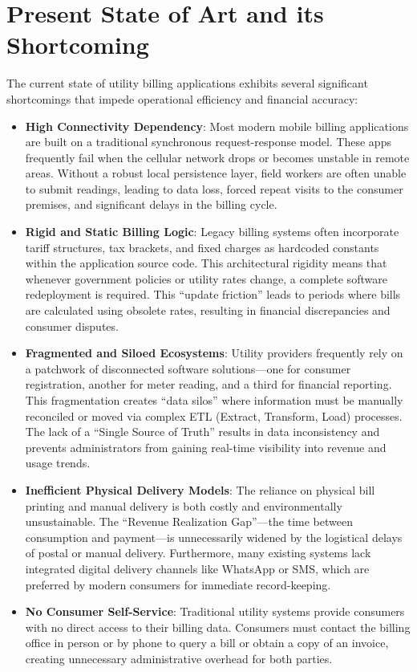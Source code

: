 \documentclass[12pt, a4paper, onecolumn]{report}
\begin{document}
\section{Present State of Art and its Shortcoming}
The current state of utility billing applications exhibits several significant shortcomings that impede operational efficiency and financial accuracy:
\begin{itemize}
    \item \textbf{High Connectivity Dependency}: Most modern mobile billing applications are built on a traditional synchronous request-response model. These apps frequently fail when the cellular network drops or becomes unstable in remote areas. Without a robust local persistence layer, field workers are often unable to submit readings, leading to data loss, forced repeat visits to the consumer premises, and significant delays in the billing cycle.
    \item \textbf{Rigid and Static Billing Logic}: Legacy billing systems often incorporate tariff structures, tax brackets, and fixed charges as hardcoded constants within the application source code. This architectural rigidity means that whenever government policies or utility rates change, a complete software redeployment is required. This ``update friction'' leads to periods where bills are calculated using obsolete rates, resulting in financial discrepancies and consumer disputes.
    \item \textbf{Fragmented and Siloed Ecosystems}: Utility providers frequently rely on a patchwork of disconnected software solutions---one for consumer registration, another for meter reading, and a third for financial reporting. This fragmentation creates ``data silos'' where information must be manually reconciled or moved via complex ETL (Extract, Transform, Load) processes. The lack of a ``Single Source of Truth'' results in data inconsistency and prevents administrators from gaining real-time visibility into revenue and usage trends.
    \item \textbf{Inefficient Physical Delivery Models}: The reliance on physical bill printing and manual delivery is both costly and environmentally unsustainable. The ``Revenue Realization Gap''---the time between consumption and payment---is unnecessarily widened by the logistical delays of postal or manual delivery. Furthermore, many existing systems lack integrated digital delivery channels like WhatsApp or SMS, which are preferred by modern consumers for immediate record-keeping.
    \item \textbf{No Consumer Self-Service}: Traditional utility systems provide consumers with no direct access to their billing data. Consumers must contact the billing office in person or by phone to query a bill or obtain a copy of an invoice, creating unnecessary administrative overhead for both parties.
\end{itemize}
\end{document}
